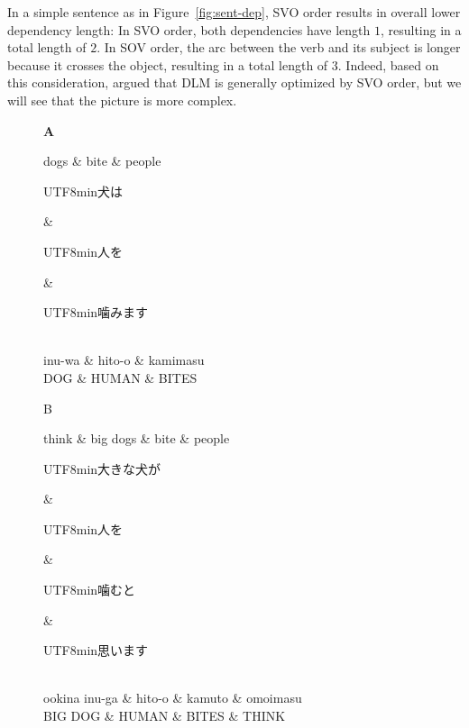 \documentclass[11pt,a4paper]{article}
\newcommand{\japanese}[1]{\begin{CJK}{UTF8}{min}#1\end{CJK}}
\begin{document}
In a simple sentence as in Figure~\ref{fig:sent-dep}, SVO order results in overall lower dependency length:
In SVO order, both dependencies have length $1$, resulting in a total length of $2$.
In SOV order, the arc between the verb and its subject is longer because it crosses the object, resulting in a total length of $3$.
Indeed, based on this consideration, \cite{ferrer-i-cancho-placement-2017} argued that DLM is generally optimized by SVO order, but we will see that the picture is more complex.


\begin{figure}
\textbf{A}
\begin{dependency}[theme = simple]
   \begin{deptext}[column sep=1em]
          dogs \& bite \& people  \\
   \end{deptext}
\end{dependency}
\begin{dependency}[theme = simple]
   \begin{deptext}[column sep=1em]
   \japanese{犬は} \& \japanese{人を} \& \japanese{噛みます}\\ 
   inu-wa \& hito-o \& kamimasu \\
          DOG \& HUMAN \& BITES  \\
   \end{deptext}
\end{dependency}

B
\begin{dependency}[theme = simple]
   \begin{deptext}[column sep=1em]
       think \& big dogs \& bite \& people  \\
   \end{deptext}
\end{dependency}
\begin{dependency}[theme = simple]
   \begin{deptext}[column sep=1em]
   \japanese{大きな犬が} \& \japanese{人を} \& \japanese{噛むと} \& \japanese{思います}\\ 
   ookina inu-ga \& hito-o \& kamuto \& omoimasu \\
         BIG DOG \& HUMAN \& BITES \& THINK \\
   \end{deptext}
\end{dependency}


\end{figure}
\end{document}
